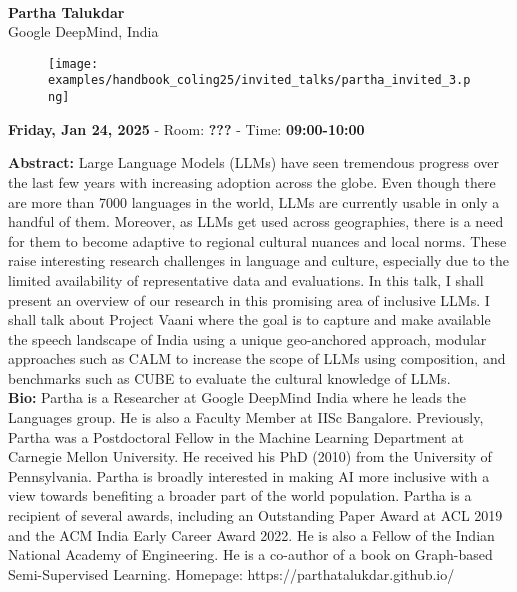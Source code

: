 \leavevmode\newline \leavevmode\newline
{\centering
{}\\  \vspace*{-0.1cm} \leavevmode\newline
{\normalsize \textbf{Partha Talukdar}}\\
{\normalsize {Google DeepMind, India}}\\


\begin{figure}[h!]
  \centering
      \texttt{[image: examples/handbook\_coling25/invited\_talks/partha\_invited\_3.png]}
\end{figure}

 {\normalsize \textbf{Friday, Jan 24, 2025} -
 Room: \textbf{???} -
 Time: \textbf{09:00-10:00}\\\leavevmode\newline
 }
}

{\textbf{Abstract:}}
Large Language Models (LLMs) have seen tremendous progress over the last few years with increasing adoption across the globe. Even though there are more than 7000 languages in the world, LLMs are currently usable in only a handful of them. Moreover, as LLMs get used across geographies, there is a need for them to become adaptive to regional cultural nuances and local norms. These raise interesting research challenges in language and culture, especially due to the limited availability of representative data and evaluations. In this talk, I shall present an overview of our research in this promising area of inclusive LLMs. I shall talk about Project Vaani where the goal is to capture and make available the speech landscape of India using a unique geo-anchored approach, modular approaches such as CALM to increase the scope of LLMs using composition, and benchmarks such as CUBE to evaluate the cultural knowledge of LLMs.\\

{\textbf{Bio:}}
Partha is a Researcher at Google DeepMind India where he leads the Languages group. He is also a Faculty Member at IISc Bangalore. Previously, Partha was a Postdoctoral Fellow in the Machine Learning Department at Carnegie Mellon University. He received his PhD (2010) from the University of Pennsylvania. Partha is broadly interested in making AI more inclusive with a view towards benefiting a broader part of the world population. Partha is a recipient of several awards, including an Outstanding Paper Award at ACL 2019 and the ACM India Early Career Award 2022. He is also a Fellow of the Indian National Academy of Engineering. He is a co-author of a book on Graph-based Semi-Supervised Learning. Homepage: https://parthatalukdar.github.io/\\

\clearpage